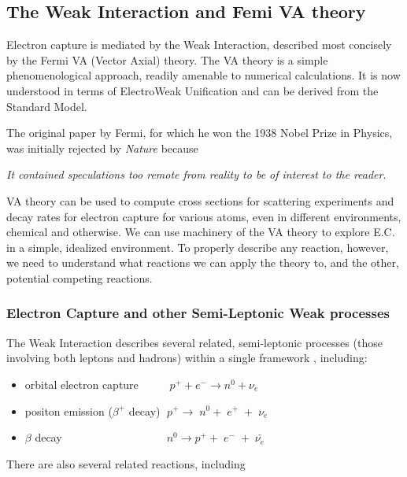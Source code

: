 \documentclass[%
 aip,
 jmp,%
 amsmath,amssymb,
 reprint,%
]{revtex4-1}
\begin{document}
\subsection{The Weak Interaction and Femi VA theory}

Electron capture is mediated by the Weak Interaction, described most concisely by the Fermi VA (Vector Axial) theory. \cite{fermi1,ec-review1,ec-review2}
The VA theory is a simple phenomenological approach, readily amenable to numerical calculations. It is now understood in terms of ElectroWeak Unification and can be derived from the Standard Model.  

The original paper by Fermi, for which he won the 1938 Nobel Prize in Physics, was initially rejected by \emph{Nature} because 

\emph{It contained speculations too remote from reality to be of interest to the reader}.\cite{close}

VA theory can be used to compute cross sections for scattering experiments and decay rates for electron capture for various atoms,  even in different environments, chemical and otherwise.  We can use machinery of the VA theory to explore E.C. in a simple, idealized environment.  To properly describe any reaction, however, we need to understand what reactions we can apply the theory to, and the other, potential competing reactions.

\subsubsection{Electron Capture and other Semi-Leptonic Weak processes} 

The Weak Interaction describes several related, semi-leptonic processes (those involving both leptons and hadrons) within a single framework \cite{langanke}, including:

\begin{itemize}
\item orbital electron capture $\;\;\;\;\;\;\;\;\;p^{+}+e^{-} \rightarrow n^{0}+\nu_{e}$

\item positon emission ($\beta^{+}$ decay) $\;p^{+}\rightarrow\;n^{0}+\;e^{+}\;+\;\nu_{e}$ 
\item $\beta$ decay $\;\;\;\;\;\;\;\;\;\;\;\;\;\;\;\;\;\;\;\;\;\;\;\;\;\;\;\;\;\;\;\;\;n^{0}\rightarrow p^{+}+\;e^{-}\;+\;\bar{\nu_{e}}$
\end{itemize}

There are also several related reactions, including
\end{document}
